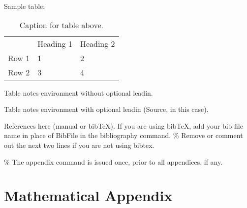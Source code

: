 \documentclass[JEL]{AEA}
\begin{document}
Sample table:

\begin{table}
\caption{Caption for table above.}

\begin{tabular}{lll}
& Heading 1 & Heading 2 \\
Row 1 & 1 & 2 \\
Row 2 & 3 & 4%
\end{tabular}
\begin{tablenotes}
Table notes environment without optional leadin.
\end{tablenotes}
\begin{tablenotes}[Source]
Table notes environment with optional leadin (Source, in this case).
\end{tablenotes}
\end{table}

References here (manual or bibTeX). If you are using bibTeX, add your
bib file name in place of BibFile in the bibliography command. \% Remove
or comment out the next two lines if you are not using bibtex.




\% The appendix command is issued once, prior to all appendices, if any.
\appendix

\section{Mathematical Appendix}
\end{document}

